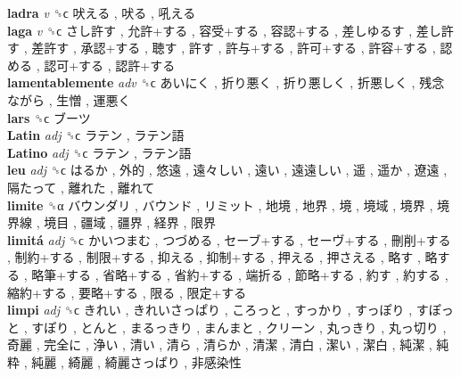 \textbf{ladra} \emph{v}  ␝ϲ   吠える ,  吠る ,  吼える   \\
\textbf{laga} \emph{v}  ␝ϲ   さし許す ,  允許+する ,  容受+する ,  容認+する ,  差しゆるす ,  差し許す ,  差許す ,  承認+する ,  聴す ,  許す ,  許与+する ,  許可+する ,  許容+する ,  認める ,  認可+する ,  認許+する   \\
\textbf{lamentablemente} \emph{adv}  ␝ϲ   あいにく ,  折り悪く ,  折り悪しく ,  折悪しく ,  残念ながら ,  生憎 ,  運悪く   \\
\textbf{lars} ␝ϲ   ブーツ   \\
\textbf{Latin} \emph{adj}  ␝ϲ   ラテン ,  ラテン語   \\
\textbf{Latino} \emph{adj}  ␝ϲ   ラテン ,  ラテン語   \\
\textbf{leu} \emph{adj}  ␝ϲ   はるか ,  外的 ,  悠遠 ,  遠々しい ,  遠い ,  遠遠しい ,  遥 ,  遥か ,  遼遠 ,  隔たって ,  離れた ,  離れて   \\
\textbf{limite} ␝α   バウンダリ ,  バウンド ,  リミット ,  地境 ,  地界 ,  境 ,  境域 ,  境界 ,  境界線 ,  境目 ,  疆域 ,  疆界 ,  経界 ,  限界   \\
\textbf{limitá} \emph{adj}  ␝ϲ   かいつまむ ,  つづめる ,  セーブ+する ,  セーヴ+する ,  刪削+する ,  制約+する ,  制限+する ,  抑える ,  抑制+する ,  押える ,  押さえる ,  略す ,  略する ,  略筆+する ,  省略+する ,  省約+する ,  端折る ,  節略+する ,  約す ,  約する ,  縮約+する ,  要略+する ,  限る ,  限定+する   \\
\textbf{limpi} \emph{adj}  ␝ϲ   きれい ,  きれいさっぱり ,  ころっと ,  すっかり ,  すっぽり ,  すぽっと ,  すぽり ,  とんと ,  まるっきり ,  まんまと ,  クリーン ,  丸っきり ,  丸っ切り ,  奇麗 ,  完全に ,  浄い ,  清い ,  清ら ,  清らか ,  清潔 ,  清白 ,  潔い ,  潔白 ,  純潔 ,  純粋 ,  純麗 ,  綺麗 ,  綺麗さっぱり ,  非感染性   \\

